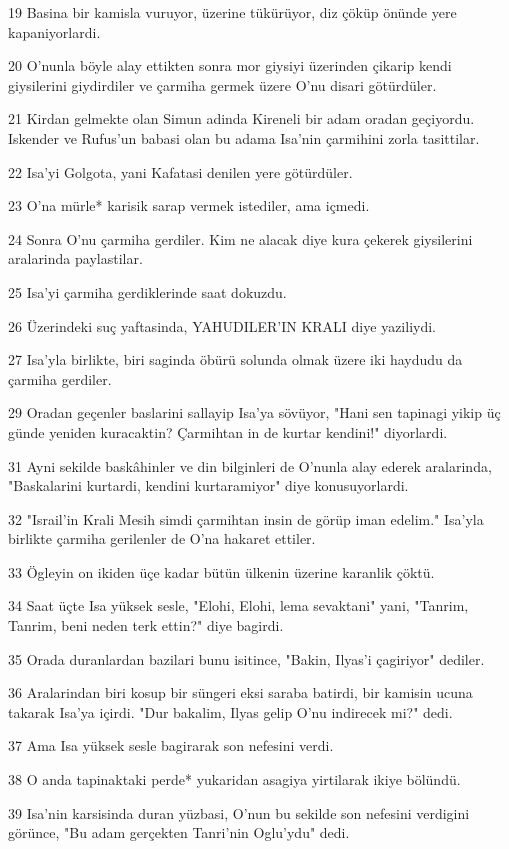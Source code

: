 \par 19 Basina bir kamisla vuruyor, üzerine tükürüyor, diz çöküp önünde yere kapaniyorlardi.
\par 20 O'nunla böyle alay ettikten sonra mor giysiyi üzerinden çikarip kendi giysilerini giydirdiler ve çarmiha germek üzere O'nu disari götürdüler.
\par 21 Kirdan gelmekte olan Simun adinda Kireneli bir adam oradan geçiyordu. Iskender ve Rufus'un babasi olan bu adama Isa'nin çarmihini zorla tasittilar.
\par 22 Isa'yi Golgota, yani Kafatasi denilen yere götürdüler.
\par 23 O'na mürle* karisik sarap vermek istediler, ama içmedi.
\par 24 Sonra O'nu çarmiha gerdiler. Kim ne alacak diye kura çekerek giysilerini aralarinda paylastilar.
\par 25 Isa'yi çarmiha gerdiklerinde saat dokuzdu.
\par 26 Üzerindeki suç yaftasinda, YAHUDILER'IN KRALI diye yaziliydi.
\par 27 Isa'yla birlikte, biri saginda öbürü solunda olmak üzere iki haydudu da çarmiha gerdiler.
\par 29 Oradan geçenler baslarini sallayip Isa'ya sövüyor, "Hani sen tapinagi yikip üç günde yeniden kuracaktin? Çarmihtan in de kurtar kendini!" diyorlardi.
\par 31 Ayni sekilde baskâhinler ve din bilginleri de O'nunla alay ederek aralarinda, "Baskalarini kurtardi, kendini kurtaramiyor" diye konusuyorlardi.
\par 32 "Israil'in Krali Mesih simdi çarmihtan insin de görüp iman edelim." Isa'yla birlikte çarmiha gerilenler de O'na hakaret ettiler.
\par 33 Ögleyin on ikiden üçe kadar bütün ülkenin üzerine karanlik çöktü.
\par 34 Saat üçte Isa yüksek sesle, "Elohi, Elohi, lema sevaktani" yani, "Tanrim, Tanrim, beni neden terk ettin?" diye bagirdi.
\par 35 Orada duranlardan bazilari bunu isitince, "Bakin, Ilyas'i çagiriyor" dediler.
\par 36 Aralarindan biri kosup bir süngeri eksi saraba batirdi, bir kamisin ucuna takarak Isa'ya içirdi. "Dur bakalim, Ilyas gelip O'nu indirecek mi?" dedi.
\par 37 Ama Isa yüksek sesle bagirarak son nefesini verdi.
\par 38 O anda tapinaktaki perde* yukaridan asagiya yirtilarak ikiye bölündü.
\par 39 Isa'nin karsisinda duran yüzbasi, O'nun bu sekilde son nefesini verdigini görünce, "Bu adam gerçekten Tanri'nin Oglu'ydu" dedi.
